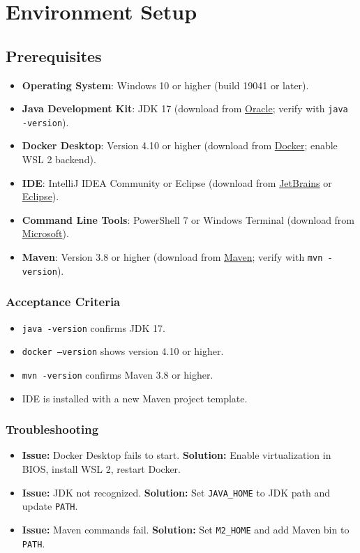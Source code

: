 \documentclass[12pt,a4paper]{report}
\begin{document}
\chapter{Environment Setup}

\section{Prerequisites}
\begin{itemize}
    \item \textbf{Operating System}: Windows 10 or higher (build 19041 or later).
    \item \textbf{Java Development Kit}: JDK 17 (download from \href{https://www.oracle.com/java/technologies/javase/jdk17-archive-downloads.html}{Oracle}; verify with \texttt{java -version}).
    \item \textbf{Docker Desktop}: Version 4.10 or higher (download from \href{https://www.docker.com/products/docker-desktop}{Docker}; enable WSL 2 backend).
    \item \textbf{IDE}: IntelliJ IDEA Community or Eclipse (download from \href{https://www.jetbrains.com/idea/download/}{JetBrains} or \href{https://www.eclipse.org/downloads/}{Eclipse}).
    \item \textbf{Command Line Tools}: PowerShell 7 or Windows Terminal (download from \href{https://learn.microsoft.com/powershell/}{Microsoft}).
    \item \textbf{Maven}: Version 3.8 or higher (download from \href{https://maven.apache.org/download.cgi}{Maven}; verify with \texttt{mvn -version}).
\end{itemize}

\subsection{Acceptance Criteria}
\begin{itemize}
    \item \texttt{java -version} confirms JDK 17.
    \item \texttt{docker --version} shows version 4.10 or higher.
    \item \texttt{mvn -version} confirms Maven 3.8 or higher.
    \item IDE is installed with a new Maven project template.
\end{itemize}

\subsection{Troubleshooting}
\begin{itemize}
    \item \textbf{Issue:} Docker Desktop fails to start.
      \textbf{Solution:} Enable virtualization in BIOS, install WSL 2, restart Docker.
    \item \textbf{Issue:} JDK not recognized.
      \textbf{Solution:} Set \texttt{JAVA_HOME} to JDK path and update \texttt{PATH}.
    \item \textbf{Issue:} Maven commands fail.
      \textbf{Solution:} Set \texttt{M2_HOME} and add Maven bin to \texttt{PATH}.
\end{itemize}
\end{document}
